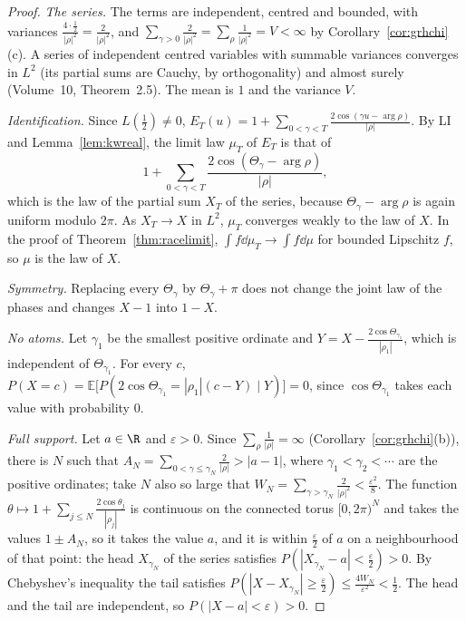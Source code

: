 \begin{proof}
\emph{The series.} The terms are independent, centred and bounded, with variances $\frac{4\cdot\frac12}{|\rho|^2}=\frac2{|\rho|^2}$, and $\sum_{\gamma>0}\frac2{|\rho|^2}=\sum_\rho\frac1{|\rho|^2}=V<\infty$ by Corollary~\ref{cor:grhchi}(c). A series of independent centred variables with summable variances converges in $L^2$ (its partial sums are Cauchy, by orthogonality) and almost surely (Volume~10, Theorem~2.5). The mean is $1$ and the variance $V$.

\emph{Identification.} Since $L(\frac12)\ne0$, $E_T(u)=1+\sum_{0<\gamma<T}\frac{2\cos(\gamma u-\arg\rho)}{|\rho|}$. By LI and Lemma~\ref{lem:kwreal}, the limit law $\mu_T$ of $E_T$ is that of
\[
1+\sum_{0<\gamma<T}\frac{2\cos(\Theta_\gamma-\arg\rho)}{|\rho|},
\]
which is the law of the partial sum $X_T$ of the series, because $\Theta_\gamma-\arg\rho$ is again uniform modulo $2\pi$. As $X_T\to X$ in $L^2$, $\mu_T$ converges weakly to the law of $X$. In the proof of Theorem~\ref{thm:racelimit}, $\int f\dd\mu_T\to\int f\dd\mu$ for bounded Lipschitz $f$, so $\mu$ is the law of $X$.

\emph{Symmetry.} Replacing every $\Theta_\gamma$ by $\Theta_\gamma+\pi$ does not change the joint law of the phases and changes $X-1$ into $1-X$.

\emph{No atoms.} Let $\gamma_1$ be the smallest positive ordinate and $Y=X-\frac{2\cos\Theta_{\gamma_1}}{|\rho_1|}$, which is independent of $\Theta_{\gamma_1}$. For every $c$, $P(X=c)=\mathbb E\bigl[P(2\cos\Theta_{\gamma_1}=|\rho_1|(c-Y)\mid Y)\bigr]=0$, since $\cos\Theta_{\gamma_1}$ takes each value with probability $0$.

\emph{Full support.} Let $a\in\R$ and $\varepsilon>0$. Since $\sum_\rho\frac1{|\rho|}=\infty$ (Corollary~\ref{cor:grhchi}(b)), there is $N$ such that $A_N=\sum_{0<\gamma\le\gamma_N}\frac2{|\rho|}>|a-1|$, where $\gamma_1<\gamma_2<\cdots$ are the positive ordinates; take $N$ also so large that $W_N=\sum_{\gamma>\gamma_N}\frac2{|\rho|^2}<\frac{\varepsilon^2}8$. The function $\theta\mapsto1+\sum_{j\le N}\frac{2\cos\theta_j}{|\rho_j|}$ is continuous on the connected torus $[0,2\pi)^N$ and takes the values $1\pm A_N$, so it takes the value $a$, and it is within $\frac\varepsilon2$ of $a$ on a neighbourhood of that point: the head $X_{\gamma_N}$ of the series satisfies $P(|X_{\gamma_N}-a|<\frac\varepsilon2)>0$. By Chebyshev's inequality the tail satisfies $P(|X-X_{\gamma_N}|\ge\frac\varepsilon2)\le\frac{4W_N}{\varepsilon^2}<\frac12$. The head and the tail are independent, so $P(|X-a|<\varepsilon)>0$.
\end{proof}

